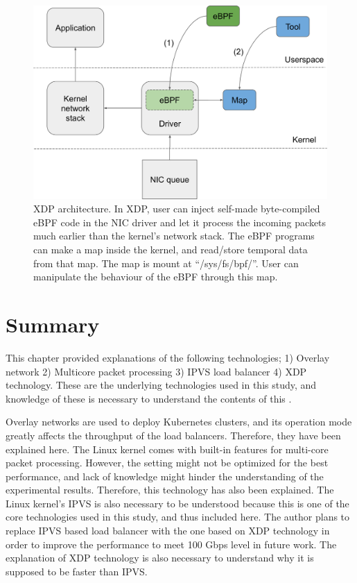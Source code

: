 \begin{figure}[h]
  \centering
  \includegraphics[width=0.95\columnwidth]{Figs/xdp-schem}

  \par\bigskip
  \centering
  \begin{minipage}{0.9\columnwidth}
    \caption[XDP architecture]{
      XDP architecture.
      In XDP, user can inject self-made byte-compiled eBPF code in the NIC driver and let it process the incoming packets much earlier than the kernel's network stack.
      The eBPF programs can make a map inside the kernel, and read/store temporal data from that map.
      The map is mount at \enquote{/sys/fs/bpf/}.
      User can manipulate the behaviour of the eBPF through this map.
    }
    \label{fig:xdp-schem}
  \end{minipage}
\end{figure}

\FloatBarrier

\section{Summary}

This chapter provided explanations of the following technologies; 1) Overlay network 2) Multicore packet processing 3) IPVS load balancer 4) XDP technology.
These are the underlying technologies used in this study, and knowledge of these is necessary to understand the contents of this .

Overlay networks are used to deploy Kubernetes clusters, and its operation mode greatly affects the throughput of the load balancers.
Therefore, they have been explained here.
The Linux kernel comes with built-in features for multi-core packet processing.
However, the setting might not be optimized for the best performance, and lack of knowledge might hinder the understanding of the experimental results.
Therefore, this technology has also been explained.
The Linux kernel's IPVS is also necessary to be understood because this is one of the core technologies used in this study, and thus included here.
The author plans to replace IPVS based load balancer with the one based on XDP technology in order to improve the performance to meet 100 Gbps level in future work.
The explanation of XDP technology is also necessary to understand why it is supposed to be faster than IPVS.

